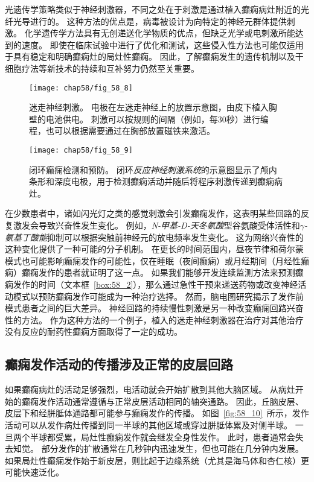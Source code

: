 \begin{proposition}[实时检测和预防癫痫的新方法]
	\quad \quad 光遗传学策略类似于神经刺激器，不同之处在于刺激是通过植入癫痫病灶附近的光纤光导进行的。
	这种方法的优点是，病毒被设计为向特定的神经元群体提供刺激。
	化学遗传学方法具有无创递送化学物质的优点，但缺乏光学或电刺激所能达到的速度。
	即使在临床试验中进行了优化和测试，这些侵入性方法也可能仅适用于具有稳定和明确癫痫灶的局灶性癫痫。
	因此，了解癫痫发生的遗传机制以及干细胞疗法等新技术的持续和互补努力仍然至关重要。
	
\end{proposition}


\begin{figure}[htbp]
	\centering
	\texttt{[image: chap58/fig\_58\_8]}
	\caption{迷走神经刺激。
		电极在左迷走神经上的放置示意图，由皮下植入胸壁的电池供电。
		刺激可以按规则的间隔（例如，每30秒）进行编程，也可以根据需要通过在胸部放置磁铁来激活\cite{stacey2008technology}。}
	\label{fig:58_8}
\end{figure}


\begin{figure}[htbp]
	\centering
	\texttt{[image: chap58/fig\_58\_9]}
	\caption{闭环癫痫检测和预防。
		闭环\textit{反应神经刺激系统}的示意图显示了颅内条形和深度电极，用于检测癫痫活动并随后将程序刺激传递到癫痫病灶\cite{heck2014two}。}
	\label{fig:58_9}
\end{figure}



在少数患者中，诸如闪光灯之类的感觉刺激会引发癫痫发作，这表明某些回路的反复激发会导致兴奋性发生变化。
例如，\textit{N-甲基-D-天冬氨酸}型谷氨酸受体活性和\textit{$\gamma$-氨基丁酸能}抑制可以根据突触前神经元的放电频率发生变化。
这为网络兴奋性的这种变化提供了一种可能的分子机制。
在更长的时间范围内，昼夜节律和荷尔蒙模式也可能影响癫痫发作的可能性，仅在睡眠（夜间癫痫）或月经期间（月经性癫痫）癫痫发作的患者就证明了这一点。
如果我们能够开发连续监测方法来预测癫痫发作的时间（文本框~\ref{box:58_2}），那么通过急性干预来递送药物或改变神经活动模式以预防癫痫发作可能成为一种治疗选择。
然而，脑电图研究揭示了发作前模式患者之间的巨大差异。
神经回路的持续慢性刺激是另一种改变癫痫回路兴奋性的方法。
作为这种方法的一个例子，植入的迷走神经刺激器在治疗对其他治疗没有反应的耐药性癫痫方面取得了一定的成功。



\subsection{癫痫发作活动的传播涉及正常的皮层回路}

如果癫痫病灶的活动足够强烈，电活动就会开始扩散到其他大脑区域。
从病灶开始的癫痫发作活动通常遵循与正常皮层活动相同的轴突通路。
因此，丘脑皮层、皮层下和经胼胝体通路都可能参与癫痫发作的传播。
如图~\ref{fig:58_10}~所示，发作活动可以从发作病灶传播到同一半球的其他区域或穿过胼胝体累及对侧半球。
一旦两个半球都受累，局灶性癫痫发作就会继发全身性发作。
此时，患者通常会失去知觉。
部分发作的扩散通常在几秒钟内迅速发生，但也可能在几分钟内发展。
如果局灶性癫痫发作始于新皮层，则比起于边缘系统（尤其是海马体和杏仁核）更可能快速泛化。


